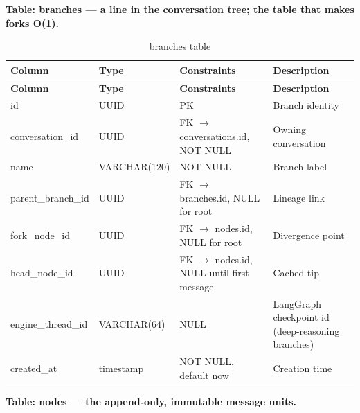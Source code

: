\documentclass[12pt,a4paper]{report}
\begin{document}
\noindent\textbf{Table: branches --- a line in the conversation tree; the table that makes forks O(1).}

\begingroup
\setlength{\parskip}{0pt}\renewcommand{\arraystretch}{1.32}\footnotesize
\begin{xltabular}{\textwidth}{>{\hsize\raggedright\arraybackslash}X >{\hsize\raggedright\arraybackslash}X >{\hsize\raggedright\arraybackslash}X >{\hsize\raggedright\arraybackslash}X}
\caption{branches table}\\
\toprule
\textbf{Column} & \textbf{Type} & \textbf{Constraints} & \textbf{Description} \\
\midrule\endfirsthead
\toprule
\textbf{Column} & \textbf{Type} & \textbf{Constraints} & \textbf{Description} \\
\midrule\endhead
\bottomrule\endfoot
id & UUID & PK & Branch identity \\
conversation\_id & UUID & FK $\rightarrow$ conversations.id, NOT NULL & Owning conversation \\
name & VARCHAR(120) & NOT NULL & Branch label \\
parent\_branch\_id & UUID & FK $\rightarrow$ branches.id, NULL for root & Lineage link \\
fork\_node\_id & UUID & FK $\rightarrow$ nodes.id, NULL for root & Divergence point \\
head\_node\_id & UUID & FK $\rightarrow$ nodes.id, NULL until first message & Cached tip \\
engine\_thread\_id & VARCHAR(64) & NULL & LangGraph checkpoint id (deep-reasoning branches) \\
created\_at & timestamp & NOT NULL, default now & Creation time \\
\end{xltabular}
\endgroup

\noindent\textbf{Table: nodes --- the append-only, immutable message units.}
\end{document}
